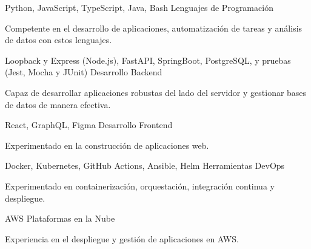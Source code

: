 \begin{cventries}
  \cventry
  {Python, JavaScript, TypeScript, Java, Bash}
  {Lenguajes de Programación}
  {}
  {}
  {
    \begin{cvitems}
      \item {Competente en el desarrollo de aplicaciones, automatización de tareas y análisis de datos con estos lenguajes.}
    \end{cvitems}
  }
  \cventry
  {Loopback y Express (Node.js), FastAPI, SpringBoot, PostgreSQL, y pruebas (Jest, Mocha y JUnit)}
  {Desarrollo Backend}
  {}
  {}
  {
    \begin{cvitems}
      \item{Capaz de desarrollar aplicaciones robustas del lado del servidor y gestionar bases de datos de manera efectiva.}
    \end{cvitems}
  }
  \cventry
  {React, GraphQL, Figma}
  {Desarrollo Frontend}
  {}
  {}
  {
    \begin{cvitems}
      \item {Experimentado en la construcción de aplicaciones web.}
    \end{cvitems}
  }
  \cventry
  {Docker, Kubernetes, GitHub Actions, Ansible, Helm}
  {Herramientas DevOps}
  {}
  {}
  {
    \begin{cvitems}
      \item {Experimentado en containerización, orquestación, integración continua y despliegue.}
    \end{cvitems}
  }
  \cventry
  {AWS}
  {Plataformas en la Nube}
  {}
  {}
  {
    \begin{cvitems}
      \item {Experiencia en el despliegue y gestión de aplicaciones en AWS.}
    \end{cvitems}
  }
\end{cventries}